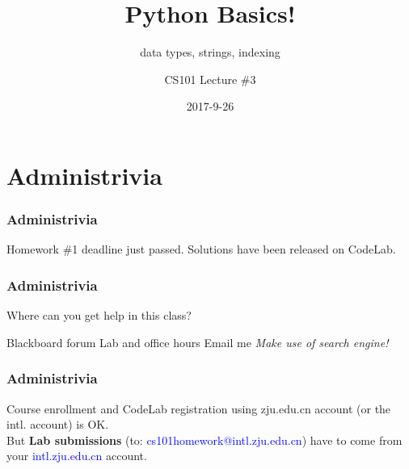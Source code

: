 \documentclass[11pt]{beamer}
\title{Python Basics!}
\subtitle{data types, strings, indexing}
\author{CS101 Lecture \#3}
\date{2017-9-26}
\begin{document}
  \setcounter{showProgressBar}{0}
  \setcounter{showSlideNumbers}{0}

\frame{\titlepage}

\setcounter{framenumber}{0}
\setcounter{showProgressBar}{1}
\setcounter{showSlideNumbers}{1}

\section{Administrivia}

\begin{frame}
  \frametitle{Administrivia}
  \Enlarge
  \begin{itemize}
  \mysubitem  Homework \#1 deadline just passed.
  \mysubitem  Solutions have been released on CodeLab.
  \end{itemize}
\end{frame}

\begin{frame}
  \frametitle{Administrivia}
  \Enlarge
  \begin{itemize}
  \myitem  Where can you get help in this class?
    \begin{itemize}
    \mysubitem  Blackboard forum 
    \mysubitem  Lab and office hours 
    \mysubitem  Email me
    \mysubitem  \emph{Make use of search engine!}
    \end{itemize} %
  \end{itemize}
\end{frame}

\begin{frame}
  \frametitle{Administrivia}
  Course enrollment and CodeLab registration using zju.edu.cn account (or the intl. account) is OK. \\
  
  \vspace{2mm}
  But {\bf Lab submissions} (to: \textcolor{blue}{cs101homework@intl.zju.edu.cn}) have to come from your \textcolor{blue}{intl.zju.edu.cn} account.
\end{frame}
\end{document}
